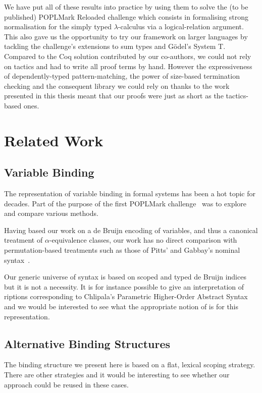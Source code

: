 We have put all of these results into practice by using them to solve the (to be
published) POPLMark Reloaded challenge which consists in formalising strong
normalisation for the simply typed $\lambda$-calculus via a logical-relation
argument. This also gave us the opportunity to try our framework on larger
languages by tackling the challenge's extensions to sum types and G\"{o}del's
System T. Compared to the Coq solution contributed by our co-authors, we could
not rely on tactics and had to write all proof terms by hand. However the
expressiveness of dependently-typed pattern-matching, the power of size-based
termination checking and the consequent library we could rely on thanks to the
work presented in this thesis meant that our proofs were just as short as
the tactics-based ones.

\section{Related Work}


\subsection{Variable Binding} The representation of variable binding
in formal systems has been a hot topic for decades. Part of the purpose
of the first POPLMark challenge~\citeyear{poplmark} was to explore and
compare various methods.

Having based our work on a de Bruijn encoding of variables, and thus a
canonical treatment of \(\alpha\)-equivalence classes, our work has no
direct comparison with permutation-based treatments such as those of
Pitts' and Gabbay's nominal syntax~\citeyear{gabbay:newaas-jv}.

Our generic universe of syntax is based on
scoped and typed de Bruijn indices~\cite{de1972lambda} but it is not
a necessity. It is for instance possible to give an interpretation
of riptions corresponding to Chlipala's Parametric Higher-Order
Abstract Syntax~\citeyear{DBLP:conf/icfp/Chlipala08} and we would be interested
to see what the appropriate notion of  is for this representation.

\subsection{Alternative Binding Structures} The binding structure we
present here is based on a flat, lexical scoping strategy. There are
other strategies and it would be interesting to see whether
our approach could be reused in these cases.

